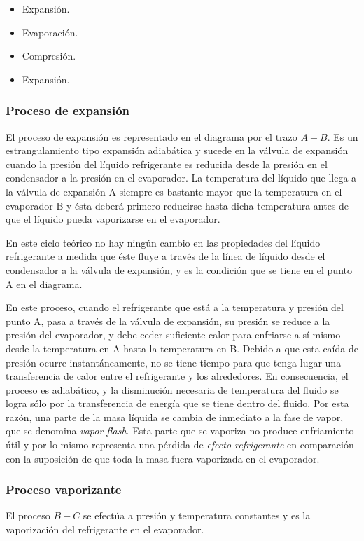 		\begin{itemize}
			\item Expansión.
			\item Evaporación.
			\item Compresión.
			\item Expansión.
		\end{itemize}
		
		\subsubsection{Proceso de expansión} El proceso de expansión es representado en el diagrama por el trazo $A-B$. Es un estrangulamiento tipo expansión adiabática y sucede en la válvula de expansión cuando la presión del líquido refrigerante es reducida desde la presión en el condensador a la presión en el evaporador. La temperatura del líquido que llega a la válvula de expansión A siempre es bastante mayor que la temperatura en el evaporador B y ésta deberá primero reducirse hasta dicha temperatura antes de que el líquido pueda vaporizarse en el evaporador.
			
			
			 
			En este ciclo teórico no hay ningún cambio en las propiedades del líquido refrigerante a medida que éste fluye a través de la línea de líquido desde el condensador a la válvula de expansión, y es la condición que se tiene en el punto A en el diagrama. 
			
				
				
			En este proceso, cuando el refrigerante que está a la temperatura y presión del punto A, pasa a través de la válvula de expansión, su presión se reduce a la presión del evaporador, y debe ceder suficiente calor para enfriarse a sí mismo desde la temperatura en A hasta la temperatura en B. Debido a que esta caída de presión ocurre instantáneamente, no se tiene tiempo para que tenga lugar una transferencia de calor entre el refrigerante y los alrededores. En consecuencia, el proceso es adiabático, y la disminución necesaria de temperatura del fluido se logra sólo por la transferencia de energía que se tiene dentro del fluido. Por esta razón, una parte de la masa líquida se cambia de inmediato a la fase de vapor, que se denomina \emph{vapor flash}. Esta parte que se vaporiza no produce enfriamiento útil y por lo mismo representa una pérdida de \emph{efecto refrigerante} en comparación con la suposición de que toda la masa fuera vaporizada en el evaporador.
			
			
			\subsubsection{Proceso vaporizante} El proceso $B-C$ se efectúa a presión y temperatura constantes y es la vaporización del refrigerante en el evaporador. 
			
